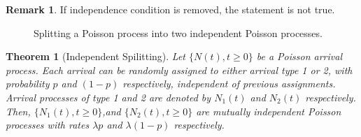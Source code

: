 \documentclass[a4paper,10pt]{article}
\theoremstyle{plain}
\newtheorem{thm}{Theorem}[section]
\theoremstyle{definition}
\newtheorem{rem}{Remark}
\begin{document}
\begin{rem}If independence condition is removed, the statement is not true.
\end{rem}
\begin{figure}[hhhh]
\center
  
 \caption{Splitting a Poisson process into two independent Poisson processes.}
\label{Fig:IndependentSplitting}
\end{figure}

\begin{thm}[Independent Spilitting] Let $\{N(t), t \geqslant 0\}$ be a Poisson arrival process. Each arrival can be randomly assigned to either arrival type 1 or 2, with probability $p$ and $(1-p)$ respectively, independent of previous assignments. Arrival processes of type 1 and 2 are denoted by $N_1(t)$ and $N_2(t)$ respectively. Then, $\{N_{1}(t), t \geqslant 0\}$,and $\{N_{2}(t), t \geqslant 0\}$ are mutually independent Poisson processes with rates $\lambda p$ and $\lambda (1-p)$ respectively.  
\end{thm}
\end{document}
